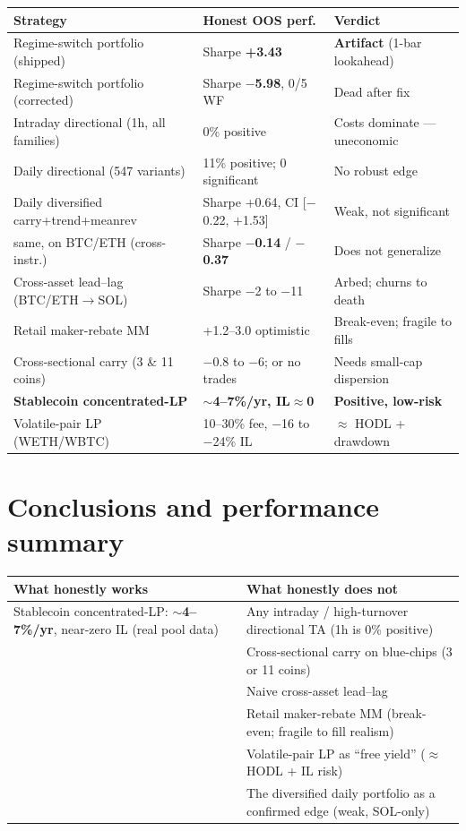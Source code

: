 \documentclass[11pt,a4paper]{article}
\newcommand{\up}[1]{{\color{good}\textbf{#1}}}
\newcommand{\dn}[1]{{\color{crit}\textbf{#1}}}
\begin{document}
\begin{center}
\small
\begin{tabular}{p{} p{} p{}}
\toprule
\textbf{Strategy} & \textbf{Honest OOS perf.} & \textbf{Verdict} \\
\midrule
Regime-switch portfolio (shipped) & Sharpe \up{+3.43} & \textbf{Artifact} (1-bar lookahead) \\
Regime-switch portfolio (corrected) & Sharpe \dn{$-$5.98}, 0/5 WF & Dead after fix \\
\midrule
Intraday directional (1h, all families) & 0\% positive & Costs dominate --- uneconomic \\
Daily directional (547 variants) & 11\% positive; 0 significant & No robust edge \\
Daily diversified carry+trend+meanrev & Sharpe +0.64, CI [$-$0.22, $+$1.53] & Weak, not significant \\
\quad same, on BTC/ETH (cross-instr.) & Sharpe \dn{$-$0.14} / \dn{$-$0.37} & Does not generalize \\
\midrule
Cross-asset lead--lag (BTC/ETH$\to$SOL) & Sharpe $-$2 to $-$11 & Arbed; churns to death \\
Retail maker-rebate MM & +1.2--3.0 optimistic & Break-even; fragile to fills \\
Cross-sectional carry (3 \& 11 coins) & $-$0.8 to $-$6; or no trades & Needs small-cap dispersion \\
\midrule
\textbf{Stablecoin concentrated-LP} & \up{$\sim$4--7\%/yr, IL$\approx$0} & \textbf{Positive, low-risk} \\
Volatile-pair LP (WETH/WBTC) & 10--30\% fee, $-$16 to $-$24\% IL & $\approx$ HODL + drawdown \\
\bottomrule
\end{tabular}
\end{center}

\section{Conclusions and performance summary}

\begin{center}
\begin{tabular}{p{} p{}}
\toprule
\textbf{What honestly works} & \textbf{What honestly does not} \\
\midrule
Stablecoin concentrated-LP: \up{$\sim$4--7\%/yr}, near-zero IL (real pool data) & Any intraday / high-turnover directional TA (1h is 0\% positive) \\[3pt]
& Cross-sectional carry on blue-chips (3 or 11 coins) \\
& Naive cross-asset lead--lag \\
& Retail maker-rebate MM (break-even; fragile to fill realism) \\
& Volatile-pair LP as ``free yield'' ($\approx$ HODL + IL risk) \\
& The diversified daily portfolio as a confirmed edge (weak, SOL-only) \\
\bottomrule
\end{tabular}
\end{center}
\end{document}
